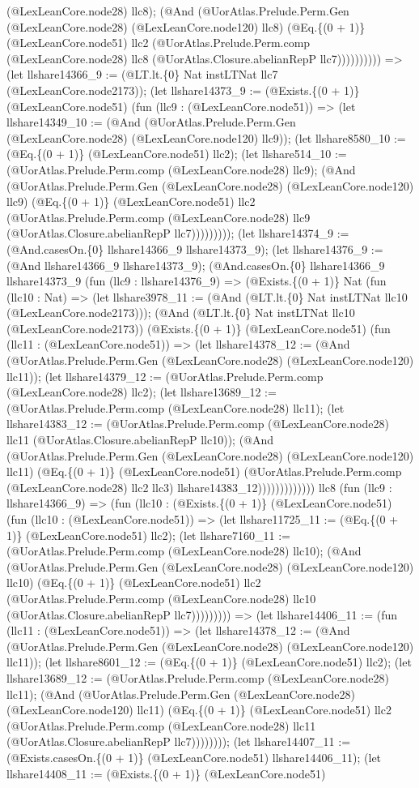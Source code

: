 \documentclass[11pt]{article}
\begin{document}
(@LexLeanCore.node28) llc8); (@And (@UorAtlas.Prelude.Perm.Gen (@LexLeanCore.node28) (@LexLeanCore.node120) llc8) (@Eq.\{(0 + 1)\} (@LexLeanCore.node51) llc2 (@UorAtlas.Prelude.Perm.comp (@LexLeanCore.node28) llc8 (@UorAtlas.Closure.abelianRepP llc7)))))))))) => (let llshare14366\_9 := (@LT.lt.\{0\} Nat instLTNat llc7 (@LexLeanCore.node2173)); (let llshare14373\_9 := (@Exists.\{(0 + 1)\} (@LexLeanCore.node51) (fun (llc9 : (@LexLeanCore.node51)) => (let llshare14349\_10 := (@And (@UorAtlas.Prelude.Perm.Gen (@LexLeanCore.node28) (@LexLeanCore.node120) llc9)); (let llshare8580\_10 := (@Eq.\{(0 + 1)\} (@LexLeanCore.node51) llc2); (let llshare514\_10 := (@UorAtlas.Prelude.Perm.comp (@LexLeanCore.node28) llc9); (@And (@UorAtlas.Prelude.Perm.Gen (@LexLeanCore.node28) (@LexLeanCore.node120) llc9) (@Eq.\{(0 + 1)\} (@LexLeanCore.node51) llc2 (@UorAtlas.Prelude.Perm.comp (@LexLeanCore.node28) llc9 (@UorAtlas.Closure.abelianRepP llc7))))))))); (let llshare14374\_9 := (@And.casesOn.\{0\} llshare14366\_9 llshare14373\_9); (let llshare14376\_9 := (@And llshare14366\_9 llshare14373\_9); (@And.casesOn.\{0\} llshare14366\_9 llshare14373\_9 (fun (llc9 : llshare14376\_9) => (@Exists.\{(0 + 1)\} Nat (fun (llc10 : Nat) => (let llshare3978\_11 := (@And (@LT.lt.\{0\} Nat instLTNat llc10 (@LexLeanCore.node2173))); (@And (@LT.lt.\{0\} Nat instLTNat llc10 (@LexLeanCore.node2173)) (@Exists.\{(0 + 1)\} (@LexLeanCore.node51) (fun (llc11 : (@LexLeanCore.node51)) => (let llshare14378\_12 := (@And (@UorAtlas.Prelude.Perm.Gen (@LexLeanCore.node28) (@LexLeanCore.node120) llc11)); (let llshare14379\_12 := (@UorAtlas.Prelude.Perm.comp (@LexLeanCore.node28) llc2); (let llshare13689\_12 := (@UorAtlas.Prelude.Perm.comp (@LexLeanCore.node28) llc11); (let llshare14383\_12 := (@UorAtlas.Prelude.Perm.comp (@LexLeanCore.node28) llc11 (@UorAtlas.Closure.abelianRepP llc10)); (@And (@UorAtlas.Prelude.Perm.Gen (@LexLeanCore.node28) (@LexLeanCore.node120) llc11) (@Eq.\{(0 + 1)\} (@LexLeanCore.node51) (@UorAtlas.Prelude.Perm.comp (@LexLeanCore.node28) llc2 llc3) llshare14383\_12))))))))))))) llc8 (fun (llc9 : llshare14366\_9) => (fun (llc10 : (@Exists.\{(0 + 1)\} (@LexLeanCore.node51) (fun (llc10 : (@LexLeanCore.node51)) => (let llshare11725\_11 := (@Eq.\{(0 + 1)\} (@LexLeanCore.node51) llc2); (let llshare7160\_11 := (@UorAtlas.Prelude.Perm.comp (@LexLeanCore.node28) llc10); (@And (@UorAtlas.Prelude.Perm.Gen (@LexLeanCore.node28) (@LexLeanCore.node120) llc10) (@Eq.\{(0 + 1)\} (@LexLeanCore.node51) llc2 (@UorAtlas.Prelude.Perm.comp (@LexLeanCore.node28) llc10 (@UorAtlas.Closure.abelianRepP llc7))))))))) => (let llshare14406\_11 := (fun (llc11 : (@LexLeanCore.node51)) => (let llshare14378\_12 := (@And (@UorAtlas.Prelude.Perm.Gen (@LexLeanCore.node28) (@LexLeanCore.node120) llc11)); (let llshare8601\_12 := (@Eq.\{(0 + 1)\} (@LexLeanCore.node51) llc2); (let llshare13689\_12 := (@UorAtlas.Prelude.Perm.comp (@LexLeanCore.node28) llc11); (@And (@UorAtlas.Prelude.Perm.Gen (@LexLeanCore.node28) (@LexLeanCore.node120) llc11) (@Eq.\{(0 + 1)\} (@LexLeanCore.node51) llc2 (@UorAtlas.Prelude.Perm.comp (@LexLeanCore.node28) llc11 (@UorAtlas.Closure.abelianRepP llc7)))))))); (let llshare14407\_11 := (@Exists.casesOn.\{(0 + 1)\} (@LexLeanCore.node51) llshare14406\_11); (let llshare14408\_11 := (@Exists.\{(0 + 1)\} (@LexLeanCore.node51) 
\end{document}
